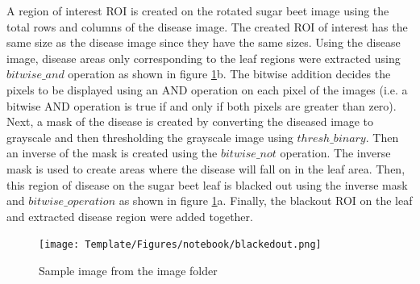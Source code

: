 A region of interest ROI is created on the rotated sugar beet image using the total rows and columns of the disease image. The created ROI of interest has the same size as the disease image since they have the same sizes. Using the disease image, disease areas only corresponding to the leaf regions were extracted using $bitwise\_and$ operation as shown in figure \ref{fig:my_blackout}b. The bitwise addition decides the pixels to be displayed using an AND operation on each pixel of the images (i.e. a bitwise AND operation is true if and only if both pixels are greater than zero). Next, a mask of the disease is created by converting the diseased image to grayscale and then thresholding the grayscale image using $thresh\_binary$. Then an inverse of the mask is created using the $bitwise\_not$ operation. The inverse mask is used to create areas where the disease will fall on in the leaf area. Then, this region of disease on the sugar beet leaf is blacked out using the inverse mask and $bitwise\_operation$ as shown in figure \ref{fig:my_blackout}a.
Finally, the blackout ROI on the leaf and extracted disease region were added together.



\begin{figure}[!htb]
    \centering
    \texttt{[image: Template/Figures/notebook/blackedout.png]}
    \caption{Sample image from the image folder}
    \label{fig:my_blackout}
\end{figure} 

